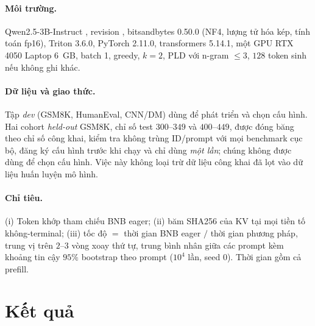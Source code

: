 \documentclass[a4paper,11pt]{article}
\newcommand{\code}[1]{\texttt{\detokenize{#1}}}
\begin{document}
\paragraph{Môi trường.} Qwen2.5-3B-Instruct \cite{qwen2024qwen25}, revision \code{aa8e7253...}, bitsandbytes 0.50.0 (NF4, lượng tử hóa kép, tính toán fp16), Triton 3.6.0, PyTorch 2.11.0, transformers 5.14.1, một GPU RTX 4050 Laptop 6~GB, batch 1, greedy, $k{=}2$, PLD với n-gram $\le 3$, $128$ token sinh nếu không ghi khác.

\paragraph{Dữ liệu và giao thức.} Tập \emph{dev} (GSM8K, HumanEval, CNN/DM) dùng để phát triển và chọn cấu hình. Hai cohort \emph{held-out} GSM8K, chỉ số test $300$--$349$ và $400$--$449$, được đóng băng theo chỉ số công khai, kiểm tra không trùng ID/prompt với mọi benchmark cục bộ, đăng ký cấu hình trước khi chạy và chỉ dùng \emph{một lần}; chúng không được dùng để chọn cấu hình. Việc này không loại trừ dữ liệu công khai đã lọt vào dữ liệu huấn luyện mô hình.

\paragraph{Chỉ tiêu.} (i) Token khớp tham chiếu BNB eager; (ii) băm SHA256 của KV tại mọi tiền tố không-terminal; (iii) tốc độ $=$ thời gian BNB eager $/$ thời gian phương pháp, trung vị trên $2$--$3$ vòng xoay thứ tự, trung bình nhân giữa các prompt kèm khoảng tin cậy $95\%$ bootstrap theo prompt ($10^4$ lần, seed 0). Thời gian gồm cả prefill.

\section{Kết quả}\label{sec:results}
\end{document}
